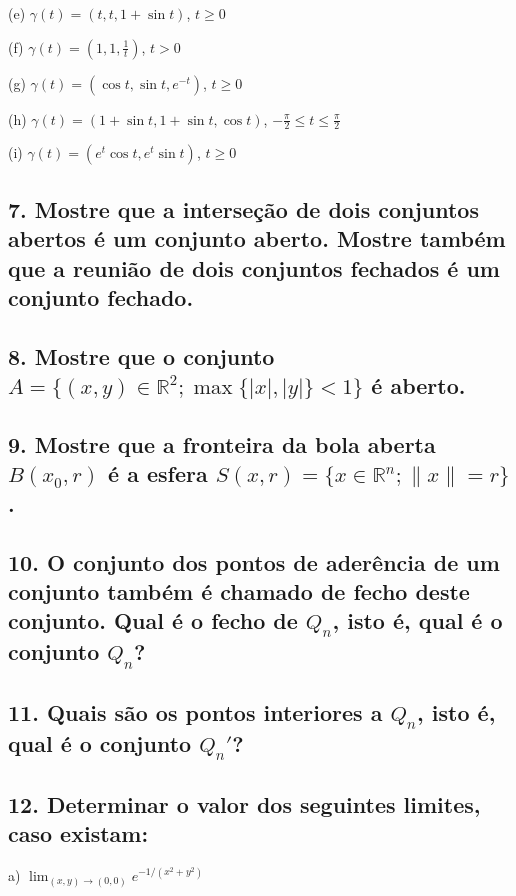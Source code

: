 \documentclass{article}
\begin{document}
        (e) $\gamma(t) = (t, t, 1 + \sin t)$, $t \geq 0$

        (f) $\gamma(t) = \left(1, 1, \frac{1}{t}\right)$, $t > 0$

        (g) $\gamma(t) = (\cos t, \sin t, e^{-t})$, $t \geq 0$

        (h) $\gamma(t) = (1 + \sin t, 1 + \sin t, \cos t)$, $-\frac{\pi}{2} \leq t \leq \frac{\pi}{2}$

        (i) $\gamma(t) = (e^t \cos t, e^t \sin t)$, $t \geq 0$

    \subsection*{7. Mostre que a interseção de dois conjuntos abertos é um conjunto aberto. Mostre também que a reunião de dois conjuntos fechados é um conjunto fechado.}

    \subsection*{8. Mostre que o conjunto $A = \{(x, y) \in \mathbb{R}^2; \max\{|x|, |y|\} < 1\}$ é aberto.}

    \subsection*{9. Mostre que a fronteira da bola aberta $B(x_0, r)$ é a esfera $S(x, r) = \{x \in \mathbb{R}^n; \|x\| = r\}$.}

    \subsection*{10. O conjunto dos pontos de aderência de um conjunto também é chamado de fecho deste conjunto. Qual é o fecho de $Q_n$, isto é, qual é o conjunto $Q_n$?}

    \subsection*{11. Quais são os pontos interiores a $Q_n$, isto é, qual é o conjunto $Q_n'$?}

    \subsection*{12. Determinar o valor dos seguintes limites, caso existam:}
        \hspace*{12px}
        a) $\lim_{(x,y)\to(0,0)} e^{-1/(x^2+y^2)}$
\end{document}
